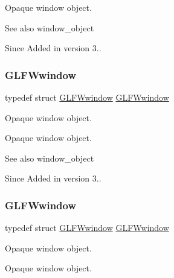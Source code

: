 Opaque window object.

\begin{DoxySeeAlso}{See also}
window\+\_\+object
\end{DoxySeeAlso}
\begin{DoxySince}{Since}
Added in version 3.. 
\end{DoxySince}
\mbox{\label{group__window_ga3c96d80d363e67d13a41b5d1821f3242}} 
\subsubsection{\texorpdfstring{G\+L\+F\+Wwindow}{GLFWwindow}\hspace{0.1cm}{\footnotesize\ttfamily [4/5]}}
{\footnotesize\ttfamily typedef struct \hyperlink{group__window_ga3c96d80d363e67d13a41b5d1821f3242}{G\+L\+F\+Wwindow} \hyperlink{group__window_ga3c96d80d363e67d13a41b5d1821f3242}{G\+L\+F\+Wwindow}}



Opaque window object. 

Opaque window object.

\begin{DoxySeeAlso}{See also}
window\+\_\+object
\end{DoxySeeAlso}
\begin{DoxySince}{Since}
Added in version 3.. 
\end{DoxySince}
\mbox{\label{group__window_ga3c96d80d363e67d13a41b5d1821f3242}} 
\subsubsection{\texorpdfstring{G\+L\+F\+Wwindow}{GLFWwindow}\hspace{0.1cm}{\footnotesize\ttfamily [5/5]}}
{\footnotesize\ttfamily typedef struct \hyperlink{group__window_ga3c96d80d363e67d13a41b5d1821f3242}{G\+L\+F\+Wwindow} \hyperlink{group__window_ga3c96d80d363e67d13a41b5d1821f3242}{G\+L\+F\+Wwindow}}



Opaque window object. 

Opaque window object.

